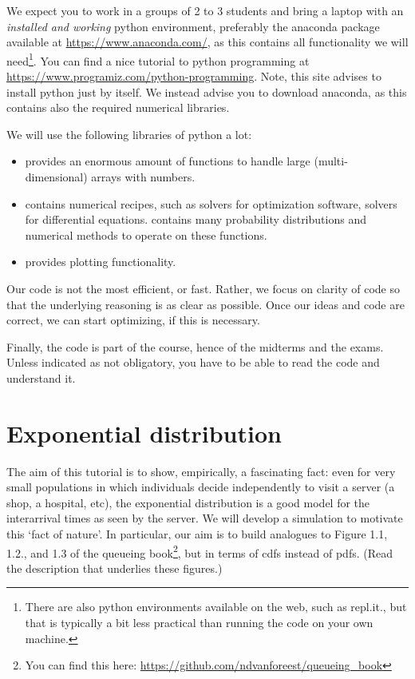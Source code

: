 \documentclass{scrartcl}
\begin{document}
We expect you to work in a groups of 2 to 3 students and bring a laptop with an \emph{installed and working} python environment, preferably  the anaconda package available at \url{https://www.anaconda.com/},  as this contains all functionality we will need\footnote{There are also python environments available on the web, such as repl.it., but that is typically a bit less practical than running the code on your own machine.}. You can find a nice tutorial to python programming at  \url{https://www.programiz.com/python-programming}. Note, this site advises to install python just by itself. We instead advise you to download anaconda, as this contains also the required numerical libraries. 

We will use the following libraries of python a lot:
\begin{itemize}
\item {}  provides an enormous amount of functions to handle large (multi-dimensional) arrays with numbers. 
\item {} contains numerical recipes, such as solvers for optimization software, solvers for differential equations.  contains many probability distributions and numerical methods to operate on these functions. 
\item {} provides plotting functionality.
\end{itemize}

Our code is not the most efficient, or fast. Rather, we focus on clarity of code so that the underlying reasoning is as clear as possible. Once our ideas and code are correct, we can start optimizing, if this is necessary. 

Finally, the code is part of the course, hence of the midterms and the exams.  Unless indicated as not obligatory, you have to be able to read the code and understand it.


\clearpage
\section{Exponential distribution}

The aim of this tutorial is to show, empirically, a fascinating fact: even for very small populations in which individuals decide independently to visit a server (a shop, a hospital, etc),  the  exponential distribution is a good model for the interarrival times as seen by the server.  We will develop a simulation to motivate this `fact of nature'.  In particular, our aim is to build analogues to Figure 1.1, 1.2., and 1.3 of the queueing book\footnote{You can find this here:
\url{https://github.com/ndvanforeest/queueing_book}}, but in terms of cdfs instead of pdfs. (Read the description that underlies these figures.)
\end{document}
